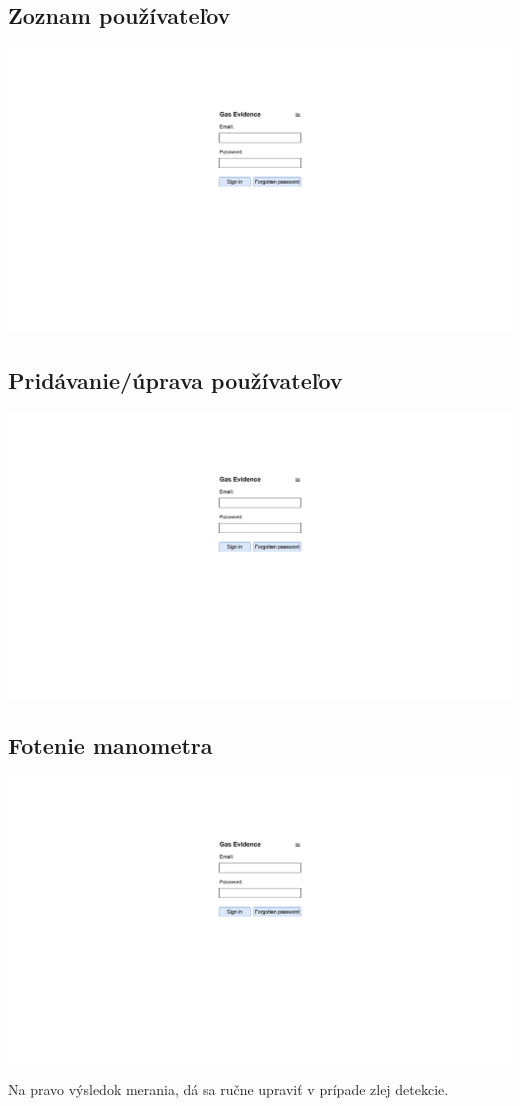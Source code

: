 \documentclass{zah}
\begin{document}
\subsection{Zoznam používateľov}
\begin{center}
\includegraphics[width=.7\textwidth,page=9]{navrh-assets/ui}
\end{center}

\subsection{Pridávanie/úprava používateľov}
\begin{center}
\includegraphics[width=.7\textwidth,page=10]{navrh-assets/ui}
\end{center}

\subsection{Fotenie manometra}
\begin{center}
\includegraphics[width=.7\textwidth,page=11]{navrh-assets/ui}
\end{center}
Na pravo výsledok merania, dá sa ručne upraviť v prípade zlej detekcie.
\end{document}
